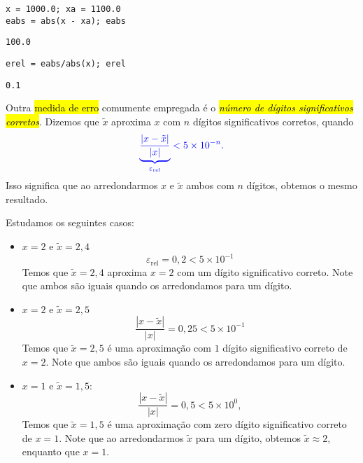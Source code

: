 \begin{ex}
\begin{enumerate}[a)]
\begin{lstlisting}
x = 1000.0; xa = 1100.0
eabs = abs(x - xa); eabs
\end{lstlisting}

\begin{verbatim}
100.0
\end{verbatim}

\begin{lstlisting}
erel = eabs/abs(x); erel
\end{lstlisting}

\begin{verbatim}
0.1
\end{verbatim}
    
  \end{enumerate}
\end{ex}

Outra \hl{medida de erro} comumente empregada é o \hl{\emph{número de dígitos significativos corretos}}. Dizemos que $\tilde{x}$ aproxima $x$ com $n$ dígitos significativos corretos, quando
\begin{equation}
  \color{blue}\underbrace{\frac{|x - \tilde{x}|}{|x|}}_{\varepsilon_{\text{rel}}} < 5\times 10^{-n}.
\end{equation}
Isso significa que ao arredondarmos $x$ e $\tilde{x}$ ambos com $n$ dígitos, obtemos o mesmo resultado.

\begin{ex}\label{ex:numdigsigcorr}
  Estudamos os seguintes casos:
  \begin{itemize}
  \item $x=2$ e $\tilde{x} = 2,4$
    \begin{equation}
      \varepsilon_{\text{rel}} = 0,2 < 5\times 10^{-1}
    \end{equation}
    Temos que $\tilde{x} = 2,4$ aproxima $x = 2$ com um dígito significativo correto. Note que ambos são iguais quando os arredondamos para um dígito.
  \item $x=2$ e $\tilde{x} = 2,5$
    \begin{equation}
      \frac{|x - \tilde{x}|}{|x|} = 0,25 < 5\times 10^{-1}
    \end{equation}
    Temos que $\tilde{x}=2,5$ é uma aproximação com $1$ dígito significativo correto de $x=2$. Note que ambos são iguais quando os arredondamos para um dígito.
  \item $x=1$ e $\tilde{x} = 1,5$:
    \begin{equation}
      \frac{|x - \tilde{x}|}{|x|} = 0,5 < 5\times 10^{0},
    \end{equation}
    Temos que $\tilde{x}=1,5$ é uma aproximação com zero dígito significativo correto de $x=1$. Note que ao arredondarmos $\tilde{x}$ para um dígito, obtemos $\tilde{x}\approx 2$, enquanto que $x=1$.
  \end{itemize}
\end{ex}

